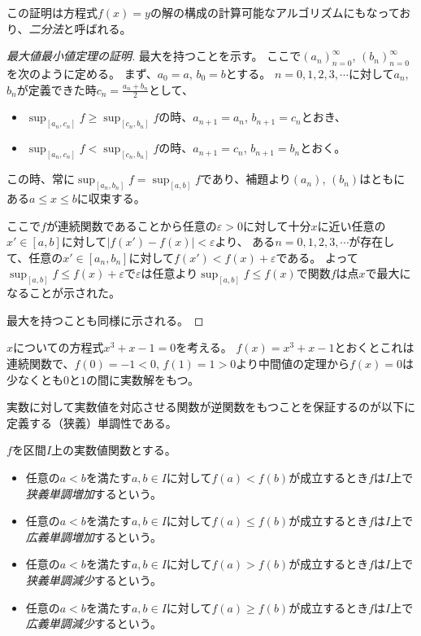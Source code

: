 \begin{remark}
この証明は方程式$f(x) = y$の解の構成の計算可能なアルゴリズムにもなっており、\emph{二分法}と呼ばれる。
\end{remark}

\begin{proof}[最大値最小値定理の証明]
最大を持つことを示す。
ここで$(a_n)_{n = 0}^\infty$, $(b_n)_{n = 0}^\infty$を次のように定める。
まず、$a_0 = a$, $b_0 = b$とする。
$n = 0, 1, 2, 3, \cdots$に対して$a_n$, $b_n$が定義できた時$c_n = \frac{a_n+b_n}{2}$として、
\begin{itemize}
\item
$\sup_{[a_n, c_n]}f \ge \sup_{[c_n, b_n]}f$の時、$a_{n+1} = a_n$, $b_{n+1} = c_n$とおき、
\item
$\sup_{[a_n, c_n]}f < \sup_{[c_n, b_n]}f$の時、$a_{n+1} = c_n$, $b_{n+1} = b_n$とおく。
\end{itemize}
この時、常に$\sup_{[a_n, b_n]}f = \sup_{[a, b]}f$であり、補題より$(a_n)$, $(b_n)$はともにある$a \le x \le b$に収束する。

ここで$f$が連続関数であることから任意の$\varepsilon > 0$に対して十分$x$に近い任意の$x' \in [a, b]$に対して$|f(x')-f(x)| < \varepsilon$より、
ある$n = 0, 1, 2, 3, \cdots$が存在して、任意の$x' \in [a_n, b_n]$に対して$f(x') < f(x)+\varepsilon$である。
よって$\sup_{[a, b]}f \le f(x)+\varepsilon$で$\varepsilon$は任意より$\sup_{[a, b]}f \le f(x)$で関数$f$は点$x$で最大になることが示された。

最大を持つことも同様に示される。
\end{proof}

\begin{example}
$x$についての方程式$x^3+x-1 = 0$を考える。
$f(x) = x^3+x-1$とおくとこれは連続関数で、$f(0) = -1 < 0$, $f(1) = 1 > 0$より中間値の定理から$f(x) = 0$は少なくとも$0$と$1$の間に実数解をもつ。
\end{example}


実数に対して実数値を対応させる関数が逆関数をもつことを保証するのが以下に定義する（狭義）単調性である。

\begin{definition}[関数の単調性]
$f$を区間$I$上の実数値関数とする。
\begin{itemize}
\item
任意の$a < b$を満たす$a, b \in I$に対して$f(a) < f(b)$が成立するとき$f$は$I$上で\emph{狭義単調増加}するという。
\item
任意の$a < b$を満たす$a, b \in I$に対して$f(a) \le f(b)$が成立するとき$f$は$I$上で\emph{広義単調増加}するという。
\item
任意の$a < b$を満たす$a, b \in I$に対して$f(a) > f(b)$が成立するとき$f$は$I$上で\emph{狭義単調減少}するという。
\item
任意の$a < b$を満たす$a, b \in I$に対して$f(a) \ge f(b)$が成立するとき$f$は$I$上で\emph{広義単調減少}するという。
\end{itemize}
\end{definition}

